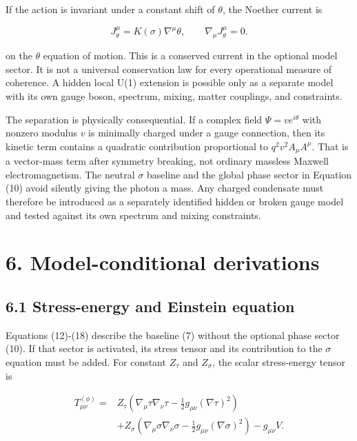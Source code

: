 \documentclass[
  american,
  11pt,
  letterpaper,
]{article}
\begin{document}
If the action is invariant under a constant shift of \(\theta\), the Noether current is

\begin{equation}
J_\theta^\mu=K(\sigma)\nabla^\mu\theta,
\qquad \nabla_\mu J_\theta^\mu=0 .
\tag{11}
\end{equation}

on the \(\theta\) equation of motion. This is a conserved current in the optional model sector. It is not a universal conservation law for every operational measure of coherence. A hidden local U(1) extension is possible only as a separate model with its own gauge boson, spectrum, mixing, matter couplings, and constraints.

The separation is physically consequential. If a complex field \(\Psi=v e^{i\theta}\) with nonzero modulus \(v\) is minimally charged under a gauge connection, then its kinetic term contains a quadratic contribution proportional to \(q^2v^2 A_\mu A^\mu\). That is a vector-mass term after symmetry breaking, not ordinary massless Maxwell electromagnetism. The neutral \(\sigma\) baseline and the global phase sector in Equation (10) avoid silently giving the photon a mass. Any charged condensate must therefore be introduced as a separately identified hidden or broken gauge model and tested against its own spectrum and mixing constraints.

\section{6. Model-conditional derivations}\label{model-conditional-derivations}

\subsection{6.1 Stress-energy and Einstein equation}\label{stress-energy-and-einstein-equation}

Equations (12)-(18) describe the baseline (7) without the optional phase sector (10). If that sector is activated, its stress tensor and its contribution to the \(\sigma\) equation must be added. For constant \(Z_\tau\) and \(Z_\sigma\), the scalar stress-energy tensor is

\[
\begin{aligned}
T^{(\phi)}_{\mu\nu}={}&
Z_\tau\left(\nabla_\mu\tau\nabla_\nu\tau
-\frac12g_{\mu\nu}(\nabla\tau)^2\right)\\
&+Z_\sigma\left(\nabla_\mu\sigma\nabla_\nu\sigma
-\frac12g_{\mu\nu}(\nabla\sigma)^2\right)
-g_{\mu\nu}V .
\end{aligned} \tag{12}
\]
\end{document}

